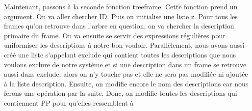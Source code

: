 Maintenant, passons à la seconde fonction treeframe. Cette fonction prend un argument. On va aller chercher ID. Puis on initialise une liste z. Pour tous les frames qu'on retrouve dans l'arbre en question, on va chercher la description primaire du frame. On va ensuite se servir des expressions régulières pour uniformiser les descriptions à notre bon vouloir. Parallèlement, nous avons aussi créé une liste s'appelant exclude qui contient toutes les descriptions que nous voulons exclure de notre système et si une description dans un frame se retrouve aussi dans exclude, alors on n'y touche pas et elle ne sera pas modifiée ni ajoutée à la liste description. Ensuite, on modifie encore le nom des descriptions car nous ferons une opération par la suite. Donc, on modifie toutes les descriptions qui contiennent PP pour qu'elles ressemblent à 



